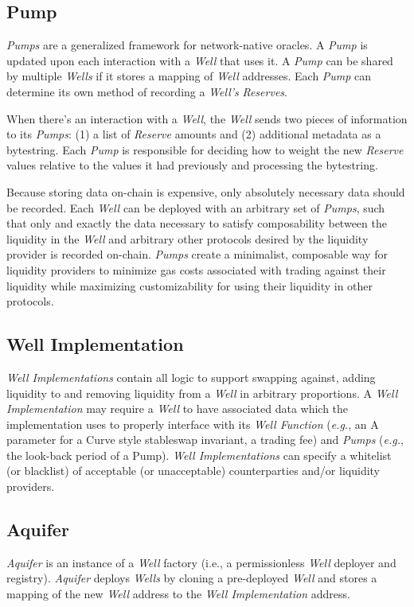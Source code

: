 \documentclass[tikz]{article}
\newcommand{\term}[1]{\textsl{#1}}
\begin{document}
\subsection{Pump}
\term{Pumps} are a generalized framework for network-native oracles. A \term{Pump} is updated upon each interaction with a \term{Well} that uses it. A \term{Pump} can be shared by multiple \term{Wells} if it stores a mapping of \term{Well} addresses. Each \term{Pump} can determine its own method of recording a \term{Well's} \term{Reserves}. 

When there’s an interaction with a \term{Well}, the \term{Well} sends two pieces of information to its \term{Pumps}: (1) a list of \term{Reserve} amounts and (2) additional metadata as a bytestring. Each \term{Pump} is responsible for deciding how to weight the new \term{Reserve} values relative to the values it had previously and processing the bytestring. 

Because storing data on-chain is expensive, only absolutely necessary data should be recorded. Each \term{Well} can be deployed with an arbitrary set of \term{Pumps}, such that only and exactly the data necessary to satisfy composability between the liquidity in the \term{Well} and arbitrary other protocols desired by the liquidity provider is recorded on-chain. \term{Pumps} create a minimalist, composable way for liquidity providers to minimize gas costs associated with trading against their liquidity while maximizing customizability for using their liquidity in other protocols.

\subsection{Well Implementation}
\term{Well Implementations} contain all logic to support swapping against, adding liquidity to and removing liquidity from a \term{Well} in arbitrary proportions. A \term{Well Implementation} may require a \term{Well} to have associated data which the implementation uses to properly interface with its \term{Well Function} (\textit{e.g.}, an A parameter for a Curve style stableswap invariant, a trading fee) and \term{Pumps} (\textit{e.g.}, the look-back period of a Pump). \term{Well Implementations} can specify a whitelist (or blacklist) of acceptable (or unacceptable) counterparties and/or liquidity providers.

\subsection{Aquifer}
\term{Aquifer} is an instance of a \term{Well} factory (i.e., a permissionless \term{Well} deployer and registry). \term{Aquifer} deploys \term{Wells} by cloning a pre-deployed \term{Well} and stores a mapping of the new \term{Well} address to the \term{Well Implementation} address. 
\end{document}

